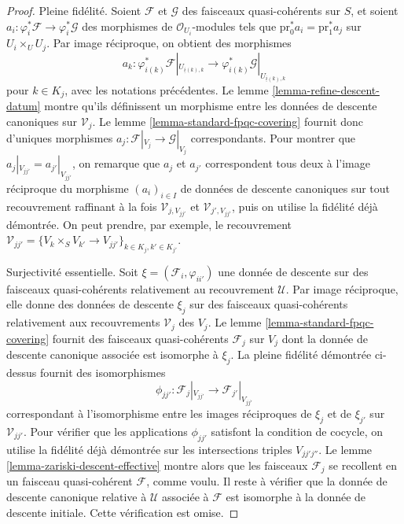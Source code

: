 \begin{proof}
\medskip\noindent
Pleine fidélité. Soient $\mathcal{F}$ et $\mathcal{G}$ des faisceaux
quasi-cohérents sur $S$, et soient
$a_i : \varphi_i^*\mathcal{F} \to \varphi_i^*\mathcal{G}$
des morphismes de $\mathcal{O}_{U_i}$-modules tels que
$\text{pr}_0^*a_i = \text{pr}_1^*a_j$ sur $U_i \times_U U_j$.
Par image réciproque, on obtient des morphismes
$$
a_k :
\varphi_{i(k)}^*\mathcal{F}|_{U_{\underline{i}(k), k}}
\longrightarrow
\varphi_{i(k)}^*\mathcal{G}|_{U_{\underline{i}(k), k}}
$$
pour $k \in K_j$, avec les notations précédentes.
Le lemme \ref{lemma-refine-descent-datum} montre qu'ils définissent
un morphisme entre les données de descente canoniques sur $\mathcal{V}_j$.
Le lemme \ref{lemma-standard-fpqc-covering} fournit donc
d'uniques morphismes $a_j : \mathcal{F}|_{V_j} \to \mathcal{G}|_{V_j}$
correspondants. Pour montrer que $a_j|_{V_{jj'}} = a_{j'}|_{V_{jj'}}$,
on remarque que $a_j$ et $a_{j'}$ correspondent tous deux à l'image réciproque
du morphisme $(a_i)_{i \in I}$ de données de descente canoniques sur
tout recouvrement raffinant à la fois $\mathcal{V}_{j, V_{jj'}}$
et $\mathcal{V}_{j', V_{jj'}}$, puis on utilise la fidélité déjà démontrée.
On peut prendre, par exemple, le recouvrement
$\mathcal{V}_{jj'} =
\{V_k \times_S V_{k'} \to V_{jj'}\}_{k \in K_j, k' \in K_{j'}}$.

\medskip\noindent
Surjectivité essentielle. Soit $\xi = (\mathcal{F}_i, \varphi_{ii'})$
une donnée de descente sur des faisceaux quasi-cohérents relativement
au recouvrement $\mathcal{U}$.
Par image réciproque, elle donne des données de descente $\xi_j$
sur des faisceaux quasi-cohérents relativement aux recouvrements
$\mathcal{V}_j$ des $V_j$.
Le lemme \ref{lemma-standard-fpqc-covering} fournit des faisceaux
quasi-cohérents $\mathcal{F}_j$ sur $V_j$ dont la donnée de descente
canonique associée est isomorphe à $\xi_j$.
La pleine fidélité démontrée ci-dessus fournit des isomorphismes
$$
\phi_{jj'} :
\mathcal{F}_j|_{V_{jj'}}
\longrightarrow
\mathcal{F}_{j'}|_{V_{jj'}}
$$
correspondant à l'isomorphisme entre les images réciproques
de $\xi_j$ et de $\xi_{j'}$ sur $\mathcal{V}_{jj'}$.
Pour vérifier que les applications $\phi_{jj'}$ satisfont
la condition de cocycle, on utilise la fidélité déjà démontrée
sur les intersections triples $V_{jj'j''}$.
Le lemme \ref{lemma-zariski-descent-effective} montre alors
que les faisceaux $\mathcal{F}_j$ se recollent en un faisceau
quasi-cohérent $\mathcal{F}$, comme voulu.
Il reste à vérifier que la donnée de descente canonique relative à
$\mathcal{U}$ associée à $\mathcal{F}$ est isomorphe à la donnée de descente
initiale. Cette vérification est omise.
\end{proof}









